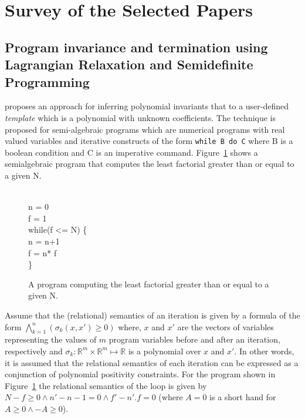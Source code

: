 \newcommand{\real}{\mathbb{R}}
\newcommand{\lmige}{\succcurlyeq}

\section{Survey of the Selected Papers}

\subsection{Program invariance and termination using Lagrangian Relaxation and Semidefinite Programming} \label{sec:paper1}

\cite{cousot:VMCAI05} proposes an approach for inferring polynomial invariants that 
to a user-defined \emph{template} which is a polynomial with unknown coefficients.
The technique is proposed for semi-algebraic programs which are numerical programs with real valued variables 
and iterative constructs of the form \texttt{while B do C} where B is a boolean condition 
and C is an imperative command. Figure~\ref{fig:SAprogram} shows a semialgebraic program that computes the least factorial greater than or equal to a given N.
%
\begin{figure}
\begin{myprogram}
\\
\pnl \>  n = 0 \\
\pnl \> f = 1 \\
\pnl \> while(f <= N) \{ \\
\pnl \> \> n = n+1 \\
\pnl \> \> f = n* f \\
\pnl \> \}
\end{myprogram}
\caption{A program computing the least factorial greater than or equal to a given N.} \label{fig:SAprogram}
\end{figure}
%
Assume that the (relational) semantics of an iteration is given by a formula of the form
$\bigwedge \limits_{k=1}^{n} (\sigma_k(x,x') \ge 0)$ where, $x$ and $x'$ are the vectors of
variables representing the values of $m$ program variables before and after an iteration, respectively 
and $\sigma_k : \real^m \times \real^m \mapsto \real$ is a polynomial over $x$ and $x'$. 
In other words, it is assumed that the relational semantics of each
iteration can be expressed as a conjunction of polynomial positivity constraints.
For the program shown in Figure~\ref{fig:SAprogram} the relational semantics of the 
loop is given by $N-f \ge 0 \wedge n' -n -1 = 0 \wedge f' - n'.f = 0$ (where 
$A = 0$ is a short hand for $A \ge 0 \wedge -A \ge 0$).

